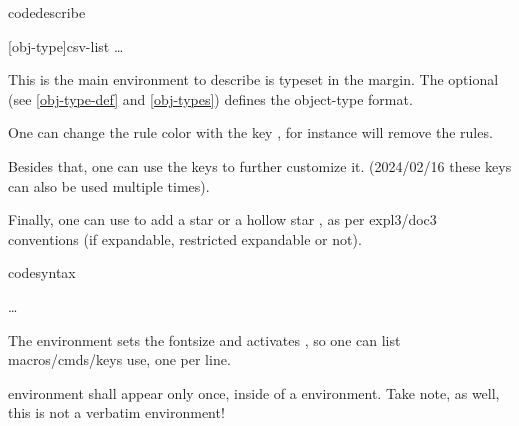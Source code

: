 \documentclass{article}
\begin{document}
\begin{codedescribe}[env,new=2023/05/01,update=2023/05/01,note={this is an example},update=2024/02/16]{codedescribe}
\begin{codesyntax}
\tsmacro{\begin{codedescribe}}[obj-type]{csv-list}
\ldots
\tsmacro{\end{codedescribe}}{}
\end{codesyntax}
This is the main environment to describe    is typeset in the margin. The optional  (see \ref{obj-type-def} and \ref{obj-types}) defines the object-type format. 
\end{codedescribe}
\begin{tsremark}[Note~1:]
One can change the rule color with the key , for instance \tsmacro{\begin{codedescribe}[rulecolor=white]}{} will remove the rules.
\end{tsremark}
\begin{tsremark}[Note~2:]
Besides that, one can use the keys  to further customize it. (2024/02/16 these keys can also be used multiple times).
\end{tsremark}
\begin{tsremark}[Note~3:]
Finally, one can use  to add a star  or a hollow star , as per expl3/doc3 conventions (if expandable, restricted expandable or not).
\end{tsremark}

\begin{codedescribe}[env]{codesyntax}
\begin{codesyntax}
\tsmacro{\begin{codesyntax}}{}
\ldots
\tsmacro{\end{codesyntax}}{}
\end{codesyntax}
The  environment sets the fontsize and activates \tsmacro{\obeylines,\obeyspaces}{}, so one can list macros/cmds/keys use, one per line.
\end{codedescribe}
\begin{tsremark}
 environment shall appear only once, inside of a  environment. Take note, as well, this is not a verbatim environment!
%
\end{tsremark}
\end{document}
